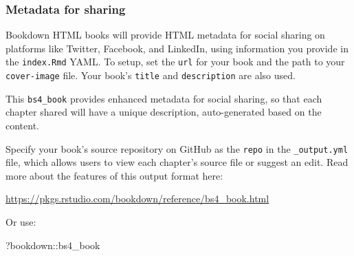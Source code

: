 \documentclass[
]{bxjsbook}
\newenvironment{Shaded}{\begin{snugshade}}{\end{snugshade}}
\newcommand{\NormalTok}[1]{#1}
\newcommand{\SpecialCharTok}[1]{\textcolor[rgb]{0.00,0.00,0.00}{#1}}
\theoremstyle{definition}
\theoremstyle{definition}
\theoremstyle{definition}
\theoremstyle{definition}
\theoremstyle{remark}
\begin{document}
\hypertarget{metadata-for-sharing}{%
\subsubsection{Metadata for sharing}\label{metadata-for-sharing}}

Bookdown HTML books will provide HTML metadata for social sharing on platforms like Twitter, Facebook, and LinkedIn, using information you provide in the \texttt{index.Rmd} YAML. To setup, set the \texttt{url} for your book and the path to your \texttt{cover-image} file. Your book's \texttt{title} and \texttt{description} are also used.

This \texttt{bs4\_book} provides enhanced metadata for social sharing, so that each chapter shared will have a unique description, auto-generated based on the content.

Specify your book's source repository on GitHub as the \texttt{repo} in the \texttt{\_output.yml} file, which allows users to view each chapter's source file or suggest an edit. Read more about the features of this output format here:

\url{https://pkgs.rstudio.com/bookdown/reference/bs4_book.html}

Or use:

\begin{Shaded}
\begin{Highlighting}[]
\NormalTok{?bookdown}\SpecialCharTok{::}\NormalTok{bs4\_book}
\end{Highlighting}
\end{Shaded}


  
\end{document}
